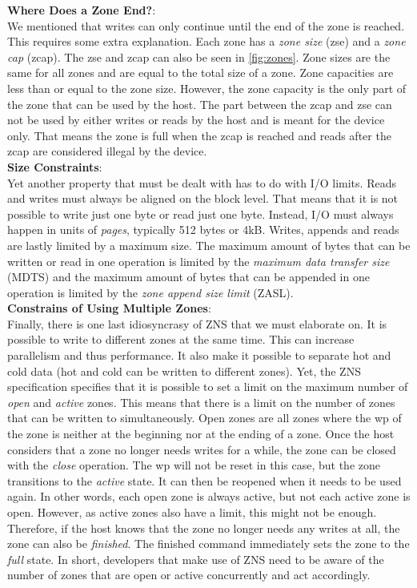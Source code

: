 \textbf{Where Does a Zone End?}:\\
We mentioned that writes can only continue until the end of the zone is reached. This requires some extra explanation. Each zone has a \textit{zone size} (zse) and a \textit{zone cap} (zcap). The zse and zcap can also be seen in \autoref{fig:zones}.  Zone sizes are the same for all zones and are equal to the total size of a zone. Zone capacities are less than or equal to the zone size. However, the zone capacity is the only part of the zone that can be used by the host. The part between the zcap and zse can not be used by either writes or reads by the host and is meant for the device only. That means the zone is full when the zcap is reached and reads after the zcap are considered illegal by the device.\\
\textbf{Size Constraints}:\\
Yet another property that must be dealt with has to do with I/O limits. Reads and writes must always be aligned on the block level. That means that it is not possible to write just one byte or read just one byte. Instead, I/O must always happen in units of \textit{pages}, typically 512 bytes or 4kB. Writes, appends and reads are lastly limited by a maximum size. The maximum amount of bytes that can be written or read in one operation is limited by the \textit{maximum data transfer size} (MDTS) and the maximum amount of bytes that can be appended in one operation is limited by the \textit{zone append size limit} (ZASL). \\
\textbf{Constrains of Using Multiple Zones}:\\
Finally, there is one last idiosyncrasy of ZNS that we must elaborate on. It is possible to write to different zones at the same time. This can increase parallelism and thus performance. It also make it possible to separate hot and cold data (hot and cold can be written to different zones). Yet, the ZNS specification specifies that it is possible to set a limit on the maximum number of \textit{open} and \textit{active} zones. This means that there is a limit on the number of zones that can be written to simultaneously. Open zones are all zones where the wp of the zone is neither at the beginning nor at the ending of a zone. Once the host considers that a zone no longer needs writes for a while, the zone can be closed with the \textit{close} operation. The wp will not be reset in this case, but the zone transitions to the \textit{active} state. It can then be reopened when it needs to be used again. In other words, each open zone is always active, but not each active zone is open. However, as active zones also have a limit, this might not be enough. Therefore, if the host knows that the zone no longer needs any writes at all, the zone can also be \textit{finished}. The finished command immediately sets the zone to the \textit{full} state.
In short, developers that make use of ZNS need to be aware of the number of zones that are open or active concurrently and act accordingly. 

